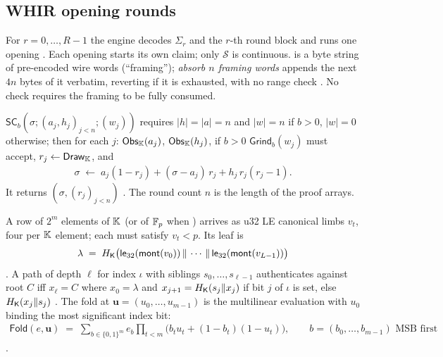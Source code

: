 \subsection{WHIR opening rounds}
\label{subsec:sv-whir}

For $r = 0,\dots,R-1$ the engine decodes $\Sigma_r$ and the $r$-th round block and
runs one opening . Each opening starts its
own claim; only $\mathcal{S}$ is continuous.  is a byte string of
pre-encoded wire words (``framing''); \emph{absorb $n$ framing words} appends the
next $4n$ bytes of it verbatim, reverting if it is exhausted, with no range
check  . No
check requires the framing to be fully consumed.

\begin{definition}
\label{def:sv-sumcheck}
$\mathsf{SC}_b(\sigma; (a_j,h_j)_{j<n}; (w_j))$ requires $|h| = |a| = n$ and
$|w| = n$ if $b>0$, $|w|=0$ otherwise; then for each $j$:
$\mathsf{Obs}_{\mathbb{K}}(a_j)$, $\mathsf{Obs}_{\mathbb{K}}(h_j)$, if $b>0$ $\mathsf{Grind}_b(w_j)$ must
accept, $r_j \gets \mathsf{Draw}_{\mathbb{K}}$, and
\begin{align}
  \sigma \;\gets\; a_j(1-r_j) + (\sigma - a_j)\, r_j + h_j\, r_j (r_j - 1).
\end{align}
It returns $(\sigma, (r_j)_{j<n})$ . The
round count $n$ is the length of the proof arrays.
\end{definition}

\begin{definition}
\label{def:sv-open}
A row of $2^m$ elements of $\mathbb{K}$ (or of $\mathbb{F}_p$ when ) arrives as u32
LE canonical limbs $v_t$, four per $\mathbb{K}$ element; each must satisfy $v_t<p$. Its
leaf is
\begin{align}
  \lambda \;=\; H_{\mathsf{K}}\big(\mathsf{le}_{32}(\mathsf{mont}(v_0)) \,\|\, \cdots \,\|\,
  \mathsf{le}_{32}(\mathsf{mont}(v_{L-1}))\big)
\end{align}
 . A path of
depth $\ell$ for index $\iota$ with siblings $s_0,\dots,s_{\ell-1}$ authenticates
against root $C$ iff $x_\ell = C$ where $x_0=\lambda$ and
$x_{j+1} = H_{\mathsf{K}}(s_j \| x_j)$ if bit $j$ of $\iota$ is set, else
$H_{\mathsf{K}}(x_j \| s_j)$ . The fold at
$\mathbf{u} = (u_0,\dots,u_{m-1})$ is the multilinear evaluation with $u_0$ binding
the most significant index bit:
\begin{align}
  \mathsf{Fold}(e,\mathbf{u}) \;=\; \sum_{b \in \{0,1\}^m} e_{b}
  \prod_{t<m} \big(b_t u_t + (1-b_t)(1-u_t)\big),
  \qquad b = (b_0,\dots,b_{m-1}) \text{ MSB first}
\end{align}
 .
\end{definition}

